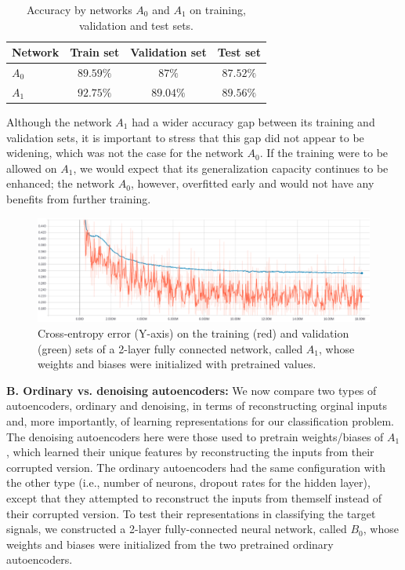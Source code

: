\documentclass[12pt]{article}
\begin{document}
\begin{table}
\begin{center}
\begin{tabular}{|l||c|c|c|}
\hline
Network & Train set & Validation set & Test set \\ \hline \hline
$A_0$ & $89.59\%$ & $87\%$ & $87.52\%$ \\ \hline
$A_1$ & $92.75\%$ & $89.04\%$ & $89.56\%$ \\ \hline
\end{tabular}
\caption{Accuracy by networks $A_0$ and $A_1$ on training, validation and test sets.}
\label{tab:Accuracy_A0_vs_A1}
\end{center}
\end{table}

Although the network $A_1$ had a wider accuracy gap between its training and validation sets, it is important to stress that this gap did not appear to be widening, which was not the case for the network $A_0$. If the training were to be allowed on $A_1$, we would expect that its generalization capacity continues to be enhanced; the network $A_0$, however, overfitted early and would not have any benefits from further training.

\begin{figure}
  \includegraphics[width=\linewidth]{figures/stack_50_50_dropout_elu.eps}
  \caption{Cross-entropy error (Y-axis) on the training (red) and validation (green) sets of a 2-layer fully connected network, called $A_1$, whose weights and biases were initialized with pretrained values.}
  \label{fig:stack_50_50_dropout_elu}
\end{figure}

\vspace{5mm}
\noindent
\textbf{B. Ordinary vs. denoising autoencoders:}
\noindent
We now compare two types of autoencoders, ordinary and denoising, in terms of reconstructing orginal inputs and, more importantly, of learning representations for our classification problem. The denoising autoencoders here were those used to pretrain weights/biases of $A_1$, which learned their unique features by reconstructing the inputs from their corrupted version. The ordinary autoencoders had the same configuration with the other type (i.e., number of neurons, dropout rates for the hidden layer), except that they attempted to reconstruct the inputs from themself instead of their corrupted version. To test their representations in classifying the target signals, we constructed a 2-layer fully-connected neural network, called $B_0$, whose weights and biases were initialized from the two pretrained ordinary autoencoders.
\end{document}
